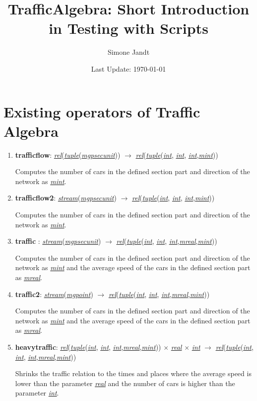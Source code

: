 \documentclass[a4paper,10pt]{article}
\title{TrafficAlgebra: Short Introduction in Testing with Scripts}
\author{Simone Jandt}
\date{Last Update: \today}
\newcommand{\op}[1]{\textbf{#1}}
\newcommand{\dt}[1]{\textsl{\underline{#1}}}
\begin{document}
\maketitle

\section{Existing operators of Traffic Algebra}

\begin{enumerate}
\item \op{trafficflow}: \dt{rel}(\dt{tuple}(\dt{mgpsecunit})) $\rightarrow$ \dt{rel}(\dt{tuple}(\dt{int}, \dt{int}, \dt{int},\dt{mint}))

Computes the number of cars in the defined section part and direction of the network as \dt{mint}.

\item \op{trafficflow2}: \dt{stream}(\dt{mgpsecunit}) $\rightarrow$ \dt{rel}(\dt{tuple}(\dt{int}, \dt{int}, \dt{int},\dt{mint}))

Computes the number of cars in the defined section part and direction of the network as \dt{mint}.

\item \op{traffic} : \dt{stream}(\dt{mgpsecunit}) $\rightarrow$ \dt{rel}(\dt{tuple}(\dt{int}, \dt{int}, \dt{int},\dt{mreal},\dt{mint}))

Computes the number of cars in the defined section part and direction of the network as \dt{mint} and the average speed of the cars in the defined section part as \dt{mreal}.

\item \op{traffic2}:  \dt{stream}(\dt{mgpoint}) $\rightarrow$ \dt{rel}(\dt{tuple}(\dt{int}, \dt{int}, \dt{int},\dt{mreal},\dt{mint}))

Computes the number of cars in the defined section part and direction of the network as \dt{mint} and the average speed of the cars in the defined section part as \dt{mreal}.

\item \op{heavytraffic}:  \dt{rel}(\dt{tuple}(\dt{int}, \dt{int}, \dt{int},\dt{mreal},\dt{mint})) $\times$ \dt{real} $\times$ \dt{int} $\rightarrow$ \dt{rel}(\dt{tuple}(\dt{int}, \dt{int}, \dt{int},\dt{mreal},\dt{mint}))
 
Shrinks the traffic relation to the times and places where the average speed is lower than the parameter \dt{real} and the number of cars is higher than the parameter \dt{int}.
\end{enumerate}
\end{document}
